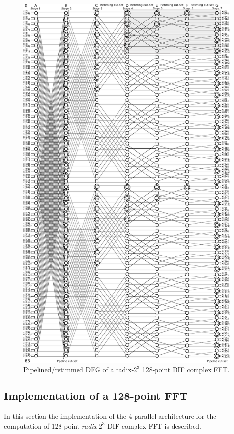 \documentclass[10pt,times,mathptm,psfig,final,journal,comsoc]{IEEEtran}
\begin{document}
\begin{figure} 
	\centering
	\includegraphics[width=\linewidth]{Diagramas/miSeccionFiguras/128puntosRadix8BurbujasPipelined_Kevin.pdf}
	\caption{Pipelined/retimmed DFG of a radix-$2^3$ 128-point DIF complex FFT.}
	\label{fig:pipe_dfg_128}
\end{figure}



\subsection{Implementation of a 128-point FFT}
In this section the implementation of the 4-parallel architecture for the computation of 128-point \textit{radix}-$2^3$ DIF complex FFT is described.
\end{document}
